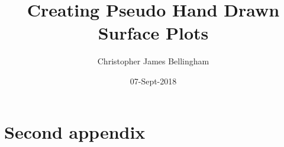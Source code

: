 \documentclass{mproj}
\begin{document}
\title{Creating Pseudo Hand Drawn Surface Plots}
\author{Christopher James Bellingham}
\date{07-Sept-2018}
\maketitle



\educationalconsent

\newpage


\tableofcontents







\appendix


\chapter{Second appendix}



\end{document}
